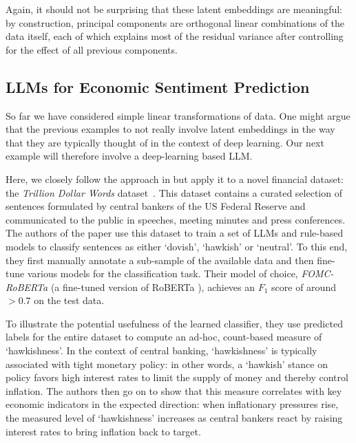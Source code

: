 \documentclass{article}
\theoremstyle{plain}
\theoremstyle{definition}
\theoremstyle{remark}
\begin{document}
Again, it should not be surprising that these latent embeddings are meaningful: by construction, principal components are orthogonal linear combinations of the data itself, each of which explains most of the residual variance after controlling for the effect of all previous components.

\subsection{LLMs for Economic Sentiment Prediction}\label{ex-llm}

So far we have considered simple linear transformations of data. One might argue that the previous examples to not really involve latent embeddings in the way that they are typically thought of in the context of deep learning. Our next example will therefore involve a deep-learning based LLM.

Here, we closely follow the approach in \citet{gurnee2023languagev2} but apply it to a novel financial dataset: the \emph{Trillion Dollar Words} dataset~\cite{shah2023trillion}. This dataset contains a curated selection of sentences formulated by central bankers of the US Federal Reserve and communicated to the public in speeches, meeting minutes and press conferences. The authors of the paper use this dataset to train a set of LLMs and rule-based models to classify sentences as either `dovish', `hawkish' or `neutral'. To this end, they first manually annotate a sub-sample of the available data and then fine-tune various models for the classification task. Their model of choice, \emph{FOMC-RoBERTa} (a fine-tuned version of RoBERTa \citep{liu2019roberta}), achieves an \(F_1\) score of around \(>0.7\) on the test data. 

To illustrate the potential usefulness of the learned classifier, they use predicted labels for the entire dataset to compute an ad-hoc, count-based measure of `hawkishness'. In the context of central banking, `hawkishness' is typically associated with tight monetary policy: in other words, a `hawkish' stance on policy favors high interest rates to limit the supply of money and thereby control inflation. The authors then go on to show that this measure correlates with key economic indicators in the expected direction: when inflationary pressures rise, the measured level of `hawkishness' increases as central bankers react by raising interest rates to bring inflation back to target.
\end{document}
